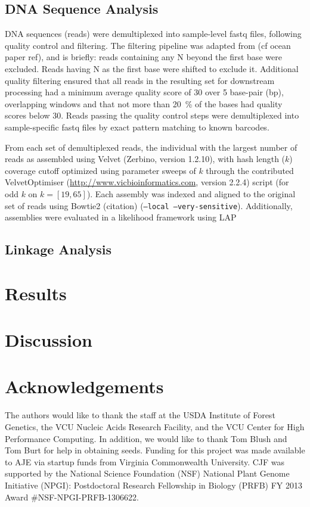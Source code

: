 \documentclass[11pt]{article}
\begin{document}
\subsection{DNA Sequence Analysis}

DNA sequences (reads) were demultiplexed into sample-level fastq files, following quality control 
and filtering.  The filtering pipeline was adapted from (cf ocean paper ref), and is briefly: reads 
containing any N beyond the first base were excluded. Reads having N as the first base were shifted 
to exclude it.  Additional quality filtering ensured that all reads in the resulting set for downstream 
processing had a minimum average quality score of 30 over 5 base-pair (bp), overlapping windows 
and that not more than \SI{20}{\percent} of the bases had quality scores below 30. Reads passing the 
quality control steps were demultiplexed into sample-specific fastq files by exact pattern matching to 
known barcodes.

From each set of demultiplexed reads, the individual with the largest number of reads as assembled using 
Velvet (Zerbino, version 1.2.10), with hash length ($k$) coverage cutoff optimized using parameter sweeps of $k$ 
through the contributed VelvetOptimiser (\url{http://www.vicbioinformatics.com}, version 2.2.4) 
script (for odd $k$ on $k=[19,65]$).  Each assembly was indexed and aligned to the original set of reads 
using Bowtie2 (citation) (\texttt{--local --very-sensitive}).  Additionally, assemblies were evaluated in a 
likelihood framework using LAP \citep{Ghodsi:2013bc}

\subsection{Linkage Analysis}

\section{Results}

\section{Discussion}

\section{Acknowledgements}

The authors would like to thank the staff at the USDA Institute of Forest Genetics, the 
VCU Nucleic Acids Research Facility, and the VCU Center for High Performance Computing. 
In addition, we would like to thank Tom Blush and Tom Burt for help in obtaining 
seeds. Funding for this project was made available to AJE via startup funds from Virginia 
Commonwealth University. CJF was supported by the National Science Foundation (NSF) National Plant Genome 
Initiative (NPGI): Postdoctoral Research Fellowship in Biology (PRFB) FY 2013 Award \#NSF-NPGI-PRFB-1306622.

\printbibliography
\end{document}
